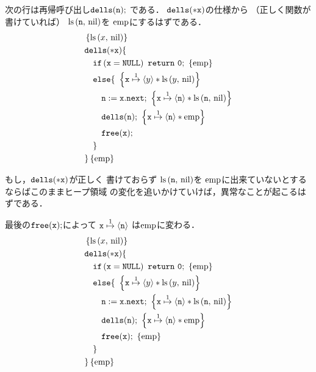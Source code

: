 \documentclass[a4paper, 10pt]{ltjsarticle}
\begin{document}
  次の行は再帰呼び出し$\mathtt{dells(n);}$
  である．
  $\mathtt{dells(*x)}$の仕様から
  （正しく関数が書けていれば）
  $\mathop{\mathrm{ls}}\left(\mathtt{n}{,}\ \mathrm{nil}\right)$を
  $\mathrm{emp}$にするはずである．
  \begin{align*}
   &  \left\{\mathprls{x}{\mathvalnil}\right\}\\
   & \mathprogramsy{dells(*x)} \{  \\
   &\quad \mathprogramsy{if\left(x = NULL\right)\ return\ 0;}\ \left\{\mathemp\right\}
   \\
     &\quad   \mathprogramsy{else \{}\  
   \left\{ \mathprogramsy{x} \mathpointer{1} \left\langle y \right\rangle * \mathprls{y}{\mathvalnil}  \right\} \\
     &\qquad  \mathprogramsy{n := x.next;}\  \left\{ \mathprogramsy{x} \mathpointer{1} \left\langle \mathprogramsy{n} \right\rangle * \mathprls{\mathprogramsy{n}}{\mathvalnil}  \right\} \\
     &\qquad  \mathprogramsy{dells(n);}\ \left\{ \mathprogramsy{x} \mathpointer{1} \left\langle \mathprogramsy{n} \right\rangle * \mathemp \right\} \\
      &\qquad  \mathprogramsy{free(x);}   %
   \\
      &\quad \mathprogramsy{\}} %
   \\
      &\mathprogramsy{\}} \left\{\mathemp\right\}
    \end{align*}

  もし，$\mathtt{dells(*x)}$が正しく
  書けておらず
  $\mathop{\mathrm{ls}}\left(\mathtt{n}{,}\ \mathrm{nil}\right)$を
  $\mathrm{emp}$に出来ていないとするならばこのままヒープ領域
  の変化を追いかけていけば，異常なことが起こるはずである．

  最後の$\mathtt{free(x);}$によって
  $\mathtt{x} \mathrel{\overset{1}{\mapsto}} \left\langle \mathtt{n} \right\rangle$
  は$\mathrm{emp}$に変わる．
  \begin{align*}
   &  \left\{\mathop{\mathrm{ls}}\left(x{,}\ \mathrm{nil}\right)\right\}\\
   & \mathtt{dells(*x)} \{  \\
   &\quad \mathtt{if\left(x = NULL\right)\ return\ 0;}\ \left\{\mathrm{emp}\right\}
   \\
     &\quad   \mathtt{else \{}\  
   \left\{ \mathtt{x} \mathrel{\overset{1}{\mapsto}} \left\langle y \right\rangle * \mathop{\mathrm{ls}}\left(y{,}\ \mathrm{nil}\right)  \right\} \\
     &\qquad  \mathtt{n := x.next;}\  \left\{ \mathtt{x} \mathrel{\overset{1}{\mapsto}} \left\langle \mathtt{n} \right\rangle * \mathop{\mathrm{ls}}\left(\mathtt{n}{,}\ \mathrm{nil}\right)  \right\} \\
     &\qquad  \mathtt{dells(n);}\ \left\{ \mathtt{x} \mathrel{\overset{1}{\mapsto}} \left\langle \mathtt{n} \right\rangle * \mathrm{emp} \right\} \\
      &\qquad  \mathtt{free(x);}\ \left\{ \mathrm{emp} \right\} \\
      &\quad \mathtt{\}} \\
      &\mathtt{\}} \left\{\mathrm{emp}\right\}
  \end{align*}
  
\end{document}
